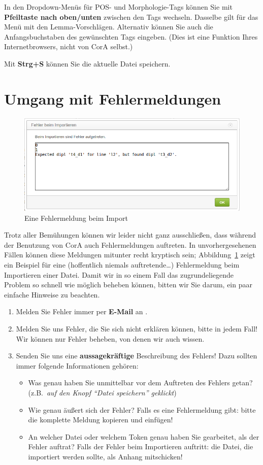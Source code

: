 \documentclass[11pt,a4paper,parskip=half]{scrartcl}
\begin{document}
In den Dropdown-Menüs für POS- und Morphologie-Tags können Sie mit
\textbf{Pfeiltaste nach oben/unten} zwischen den Tags wechseln.
Dasselbe gilt für das Menü mit den Lemma-Vorschlägen.  Alternativ
können Sie auch die Anfangsbuchstaben des gewünschten Tags eingeben.
(Dies ist eine Funktion Ihres Internetbrowsers, nicht von CorA
selbst.)

Mit \textbf{Strg+S} können Sie die aktuelle Datei speichern.

\newpage
\section{Umgang mit Fehlermeldungen}
\label{sec:error}

\begin{figure}
  \centering
  \includegraphics[width=0.8\linewidth]{img/import-error.png}
  \caption{Eine Fehlermeldung beim Import}
  \label{fig:import-error}
\end{figure}

Trotz aller Bemühungen können wir leider nicht ganz ausschließen, dass
während der Benutzung von CorA auch Fehlermeldungen auftreten.  In
unvorhergesehenen Fällen können diese Meldungen mitunter recht
kryptisch sein; Abbildung~\ref{fig:import-error} zeigt ein Beispiel
für eine (hoffentlich niemals auftretende\ldots) Fehlermeldung beim
Importieren einer Datei.  Damit wir in so einem Fall das
zugrundeliegende Problem so schnell wie möglich beheben können, bitten
wir Sie darum, ein paar einfache Hinweise zu beachten.

\begin{enumerate}
\item Melden Sie Fehler immer per \textbf{E-Mail} an \mmb{}.
\item Melden Sie uns Fehler, die Sie sich nicht erklären können, bitte
  in jedem Fall!  Wir können nur Fehler beheben, von denen wir auch
  wissen.
\item Senden Sie uns eine \textbf{aussagekräftige} Beschreibung des
  Fehlers! Dazu sollten immer folgende Informationen gehören:
  \begin{itemize}
  \item Was genau haben Sie unmittelbar vor dem Auftreten des Fehlers
    getan? (z.B.\ \emph{auf den Knopf "`Datei speichern"' geklickt})
  \item Wie genau äußert sich der Fehler? Falls es eine Fehlermeldung
    gibt: bitte die komplette Meldung kopieren und einfügen!
  \item An welcher Datei oder welchem Token genau haben Sie
    gearbeitet, als der Fehler auftrat? Falls der Fehler beim
    Importieren auftritt: die Datei, die importiert werden sollte, als
    Anhang mitschicken!
  \end{itemize}
\end{enumerate}
\end{document}
